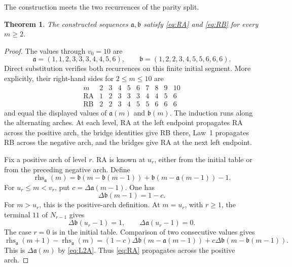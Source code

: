 \documentclass[11pt]{article}
\newtheorem{theorem}{Theorem}[section]
\theoremstyle{definition}
\theoremstyle{remark}
\begin{document}
The construction meets the two recurrences of the parity split.
\begin{theorem}
\label{thm:coupled-recurrences}
The constructed sequences \(\mathfrak a,\mathfrak b\) satisfy \eqref{eq:RA} and \eqref{eq:RB}
for every \(m\geq2\).
\end{theorem}

\begin{proof}
The values through \(v_0=10\) are
\[
 \mathfrak a=(1,1,2,3,3,3,4,4,5,6),
 \qquad
 \mathfrak b=(1,2,2,3,4,5,5,6,6,6).
\]
Direct substitution verifies both recurrences on this finite initial segment.
More explicitly, their right-hand sides for \(2\leq m\leq10\) are
\[
\begin{array}{c|ccccccccc}
 m&2&3&4&5&6&7&8&9&10\\ \hline
 \mathrm{RA}&1&2&3&3&3&4&4&5&6\\
 \mathrm{RB}&2&2&3&4&5&5&6&6&6
\end{array}
\]
and equal the displayed values of \(\mathfrak a(m)\) and \(\mathfrak b(m)\).
The induction runs along the alternating arches.  At each level, RA at the left
endpoint propagates RA across the positive arch, the bridge identities give
RB there, Law~1 propagates RB across the negative arch, and the bridges give
RA at the next left endpoint.

Fix a positive arch of level \(r\).  RA is known at \(u_r\), either from the
initial table or from the preceding negative arch.  Define
\[
 \operatorname{rhs}_{\mathfrak a}(m)
 =\mathfrak b(m-\mathfrak b(m-1))+\mathfrak b(m-\mathfrak a(m-1))-1.
\]
For \(u_r\leq m<v_r\), put \(c=\Delta \mathfrak a(m-1)\).  One has
\[
 \Delta\mathfrak b(m-1)=1-c.
\]
For \(m>u_r\), this is the positive-arch definition.  At \(m=u_r\), with
\(r\geq1\), the terminal \(11\) of \(N_{r-1}\) gives
\[
 \Delta\mathfrak b(u_r-1)=1,
 \qquad
 \Delta\mathfrak a(u_r-1)=0.
\]
The case \(r=0\) is in the initial table.  Comparison of two consecutive values gives
\[
 \operatorname{rhs}_{\mathfrak a}(m+1)-\operatorname{rhs}_{\mathfrak a}(m)
 =(1-c)\Delta \mathfrak b(m-\mathfrak a(m-1))
 +c\Delta \mathfrak b(m-\mathfrak b(m-1)).
\]
This is \(\Delta \mathfrak a(m)\) by \eqref{eq:L2A}.  Thus \eqref{eq:RA}
propagates across the positive arch.


\end{proof}
\end{document}
